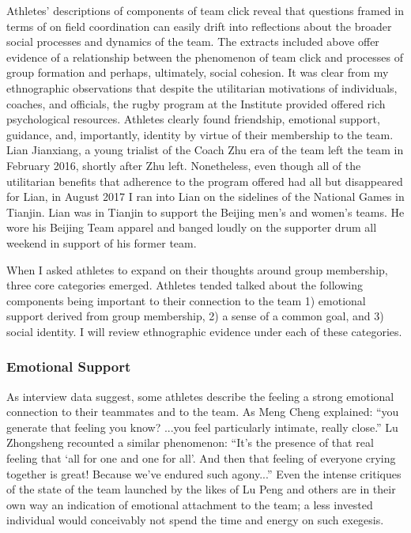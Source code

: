 \begin{CJK}{UTF8}{gbsn}
Athletes' descriptions of components of team click reveal that questions framed in terms of on field coordination can easily drift into reflections about the broader social processes and dynamics of the team.  The extracts included above offer evidence of a relationship between the phenomenon of team click and processes of group formation and perhaps, ultimately, social cohesion. It was clear from my ethnographic observations that despite the utilitarian motivations of individuals, coaches, and officials, the rugby program at the Institute provided offered rich psychological resources.  Athletes clearly found friendship, emotional support, guidance, and, importantly, identity by virtue of their membership to the team.  Lian Jianxiang, a young trialist of the Coach Zhu era of the team left the team in February 2016, shortly after Zhu left.  Nonetheless, even though all of the utilitarian benefits that adherence to the program offered had all but disappeared for Lian, in August 2017 I ran into Lian on the sidelines of the National Games in Tianjin. Lian was in Tianjin to support the Beijing men's and women's teams.  He wore his Beijing Team apparel and banged loudly on the supporter drum all weekend in support of his former team.

When I asked athletes to expand on their thoughts around group membership, three core categories emerged.  Athletes tended talked about the following components being important to their connection to the team 1) emotional support derived from group membership, 2) a sense of a common goal, and 3) social identity. I will review ethnographic evidence under each of these categories.


  \subsubsection{Emotional Support}

As interview data suggest, some athletes describe the feeling a strong emotional connection to their teammates and to the team.  As Meng Cheng explained: ``you generate that feeling you know? ...you feel particularly intimate, really close.'' Lu Zhongsheng recounted a similar phenomenon: ``It's the presence of that real feeling that `all for one and one for all'.  And then that feeling of everyone crying together is great! Because we've endured such agony...''   Even the intense critiques of the state of the team launched by the likes of Lu Peng and others are in their own way an indication of emotional attachment to the team; a less invested individual would conceivably not spend the time and energy on such exegesis.


\end{CJK}
